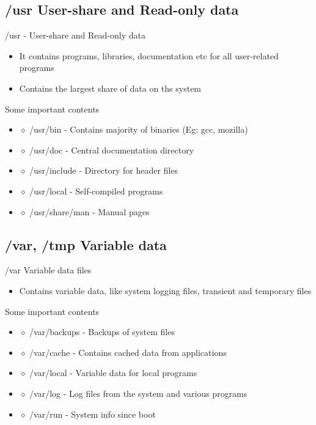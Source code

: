 \documentclass{beamer}
\begin{document}
\subsection{/usr User-share and Read-only data}
\begin{frame}{/usr -  User-share and Read-only data}
\begin{itemize}
\item It contains programs, libraries, documentation etc for all user-related programs
\item Contains the largest share of data on ths system
\end{itemize}

\begin{block}{Some important contents}
\begin{itemize}

\item[] $\diamond$ /usr/bin - Contains majority of binaries (Eg: gcc, mozilla)
\item[] $\diamond$ /usr/doc - Central documentation directory 
\item[] $\diamond$ /usr/include - Directory for header files
\item[] $\diamond$ /usr/local - Self-compiled programs
\item[] $\diamond$ /usr/share/man - Manual pages
\end{itemize}

\end{block}
\end{frame}

\subsection{/var, /tmp Variable data}

\begin{frame}{/var Variable data files}
\begin{itemize}
\setlength\itemsep{0.8em}
\item Contains variable data, like system logging files, transient and
temporary files
\end{itemize}
\pause
\begin{block}{Some important contents}
\begin{itemize}

\item[] $\diamond$ /var/backups - Backups of system files
\pause
\item[] $\diamond$ /var/cache - Contains cached data from applications
\pause
\item[] $\diamond$ /var/local - Variable data for local programs 
\pause
\item[] $\diamond$ /var/log - Log files from the system and various programs
\pause
\item[] $\diamond$ /var/run - System info since boot
\end{itemize}

\end{block}

\end{frame}
\end{document}
